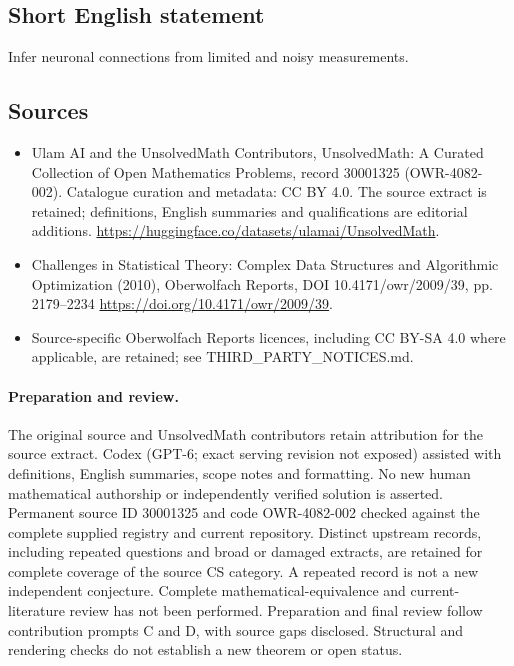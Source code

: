 \documentclass[11pt]{article}
\begin{document}
\subsection{Short English statement}
Infer neuronal connections from limited and noisy measurements.
\subsection{Sources}
\begin{itemize}
\item[\hypertarget{source:30001325:1}{S1}] Ulam AI and the UnsolvedMath Contributors, UnsolvedMath: A Curated Collection of Open Mathematics Problems, record 30001325 (OWR-4082-002). Catalogue curation and metadata: CC BY 4.0. The source extract is retained; definitions, English summaries and qualifications are editorial additions.
\url{https://huggingface.co/datasets/ulamai/UnsolvedMath}.
\item[\hypertarget{source:30001325:2}{S2}] Challenges in Statistical Theory: Complex Data Structures and Algorithmic Optimization (2010), Oberwolfach Reports, DOI 10.4171/owr/2009/39, pp. 2179--2234
\url{https://doi.org/10.4171/owr/2009/39}.
\item Source-specific Oberwolfach Reports licences, including CC BY-SA 4.0 where applicable, are retained; see THIRD\_PARTY\_NOTICES.md.
\end{itemize}
\paragraph{Preparation and review.}
The original source and UnsolvedMath contributors retain attribution for the source extract. Codex (GPT-6; exact serving revision not exposed) assisted with definitions, English summaries, scope notes and formatting. No new human mathematical authorship or independently verified solution is asserted. Permanent source ID 30001325 and code OWR-4082-002 checked against the complete supplied registry and current repository. Distinct upstream records, including repeated questions and broad or damaged extracts, are retained for complete coverage of the source CS category. A repeated record is not a new independent conjecture. Complete mathematical-equivalence and current-literature review has not been performed. Preparation and final review follow contribution prompts C and D, with source gaps disclosed. Structural and rendering checks do not establish a new theorem or open status.
\label{end:30001325}
\end{document}
